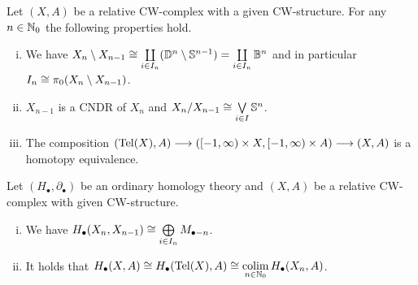 
	\begin{lemma}
		Let $(X,A)$ be a relative CW-complex with a given CW-structure. For any $n \in \mathbb{N}_0$ the following properties hold. 
		\begin{enumerate}[(i)]
			\item{
				We have $X_n \setminus X_{n-1} \cong \coprod \limits_{i \in I_n} (\mathbb{D}^n \setminus \mathbb{S}^{n-1}) = \coprod \limits_{i \in I_n} \mathbb{B}^n$ and in particular $I_n \cong \pi_0(X_n \setminus X_{n-1})$.
			}
			\item{
				$X_{n-1}$ is a CNDR of $X_n$ and $X_n / X_{n-1} \cong \operatorname*{\bigvee} \limits_{i \in I} \mathbb{S}^n$.

			}
			\item{
				The composition $(\operatorname{Tel}(X),A) --> ([-1,\infty)\times X,[-1,\infty)\times A) --> (X,A)$ is a homotopy equivalence.
			}
		\end{enumerate}
	\end{lemma}

	\begin{corollary}
		Let $(H_\bullet, \partial_\bullet)$ be an ordinary homology theory and $(X,A)$ be a relative CW-complex with given CW-structure.
		\begin{enumerate}[(i)]
			\item{
				We have $H_\bullet(X_n,X_{n-1}) \cong \bigoplus \limits_{i \in I_n}M_{\bullet-n}$.%
			}
			\item{
				It holds that $H_\bullet(X,A) \cong H_\bullet(\operatorname{Tel} (X), A) \cong \operatorname*{colim} \limits_{n \in \mathbb{N}_0} H_\bullet(X_n,A)$.
			}
		\end{enumerate}
	\end{corollary}


